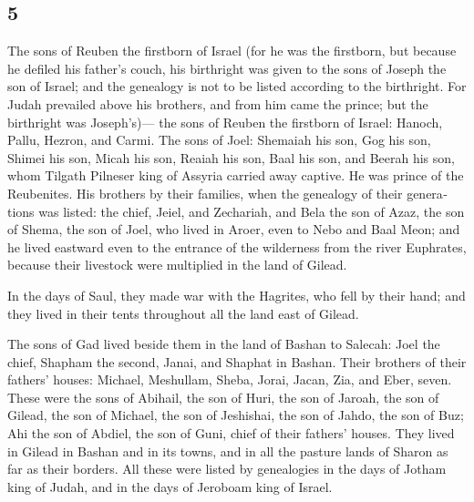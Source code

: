 \begin{paracol}{2}
\switchcolumn
\begin{otherlanguage}{english}

\hypertarget{section-9}{%
\section{5}\label{section-9}}

 The sons of Reuben the firstborn of Israel (for he was
the firstborn, but because he defiled his father's couch, his birthright
was given to the sons of Joseph the son of Israel; and the genealogy is
not to be listed according to the birthright.  For Judah
prevailed above his brothers, and from him came the prince; but the
birthright was Joseph's)---  the sons of Reuben the
firstborn of Israel: Hanoch, Pallu, Hezron, and Carmi. 
The sons of Joel: Shemaiah his son, Gog his son, Shimei his son,
 Micah his son, Reaiah his son, Baal his son,
 and Beerah his son, whom Tilgath Pilneser king of Assyria
carried away captive. He was prince of the Reubenites. 
His brothers by their families, when the genealogy of their generations
was listed: the chief, Jeiel, and Zechariah,  and Bela the
son of Azaz, the son of Shema, the son of Joel, who lived in Aroer, even
to Nebo and Baal Meon;  and he lived eastward even to the
entrance of the wilderness from the river Euphrates, because their
livestock were multiplied in the land of Gilead.

 In the days of Saul, they made war with the Hagrites,
who fell by their hand; and they lived in their tents throughout all the
land east of Gilead.

 The sons of Gad lived beside them in the land of Bashan
to Salecah:  Joel the chief, Shapham the second, Janai,
and Shaphat in Bashan.  Their brothers of their fathers'
houses: Michael, Meshullam, Sheba, Jorai, Jacan, Zia, and Eber, seven.
 These were the sons of Abihail, the son of Huri, the son
of Jaroah, the son of Gilead, the son of Michael, the son of Jeshishai,
the son of Jahdo, the son of Buz;  Ahi the son of Abdiel,
the son of Guni, chief of their fathers' houses.  They
lived in Gilead in Bashan and in its towns, and in all the pasture lands
of Sharon as far as their borders.  All these were listed
by genealogies in the days of Jotham king of Judah, and in the days of
Jeroboam king of Israel.


\end{otherlanguage}
\end{paracol}

